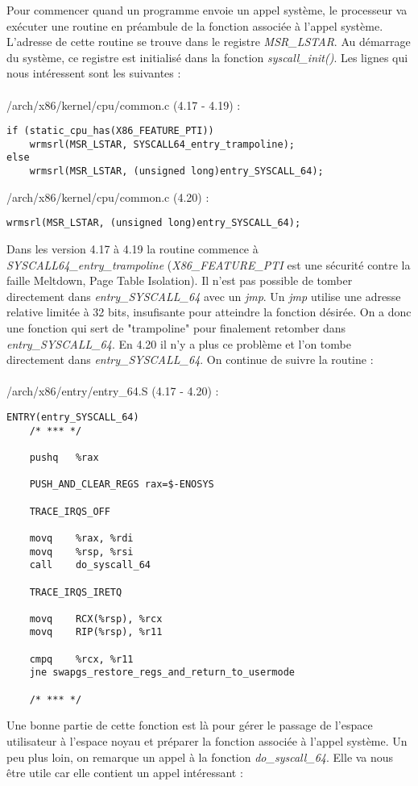 \documentclass[journal, a4paper]{IEEEtran}
\begin{document}
Pour commencer quand un programme envoie un appel système, le processeur va exécuter une routine en préambule de la fonction associée à l'appel système. L'adresse de cette routine se trouve dans le registre \textit{MSR\_LSTAR}. Au démarrage du système, ce registre est initialisé dans la fonction \textit{syscall\_init()}. Les lignes qui nous intéressent sont les suivantes :
\\
\\
/arch/x86/kernel/cpu/common.c (4.17 - 4.19) :
\begin{lstlisting}[style=CStyle]
if (static_cpu_has(X86_FEATURE_PTI))
 	wrmsrl(MSR_LSTAR, SYSCALL64_entry_trampoline);
else
 	wrmsrl(MSR_LSTAR, (unsigned long)entry_SYSCALL_64);
\end{lstlisting}
/arch/x86/kernel/cpu/common.c (4.20) :
\begin{lstlisting}[style=CStyle]
wrmsrl(MSR_LSTAR, (unsigned long)entry_SYSCALL_64);
\end{lstlisting}
Dans les version 4.17 à 4.19 la routine commence à \textit{SYSCALL64\_entry\_trampoline} (\textit{X86\_FEATURE\_PTI} est une sécurité contre la faille Meltdown, Page Table Isolation). Il n'est pas possible de tomber directement dans \textit{entry\_SYSCALL\_64} avec un \textit{jmp}. Un \textit{jmp} utilise une adresse relative limitée à 32 bits, insufisante pour atteindre la fonction désirée. On a donc une fonction qui sert de "trampoline" pour finalement retomber dans \textit{entry\_SYSCALL\_64}. En 4.20 il n'y a plus ce problème et l'on tombe directement dans \textit{entry\_SYSCALL\_64}. On continue de suivre la routine :
\\
\\
/arch/x86/entry/entry\_64.S (4.17 - 4.20) :
\begin{lstlisting}[style=CStyle]
ENTRY(entry_SYSCALL_64)
	/* *** */

	pushq	%rax

	PUSH_AND_CLEAR_REGS rax=$-ENOSYS

	TRACE_IRQS_OFF

	movq	%rax, %rdi
	movq	%rsp, %rsi
	call	do_syscall_64

	TRACE_IRQS_IRETQ

	movq	RCX(%rsp), %rcx
	movq	RIP(%rsp), %r11

	cmpq	%rcx, %r11
	jne	swapgs_restore_regs_and_return_to_usermode

	/* *** */
\end{lstlisting}
Une bonne partie de cette fonction est là pour gérer le passage de l'espace utilisateur à l'espace noyau et préparer la fonction associée à l'appel système. Un peu plus loin, on remarque un appel à la fonction \textit{do\_syscall\_64}. Elle va nous être utile car elle contient un appel intéressant :
\end{document}
